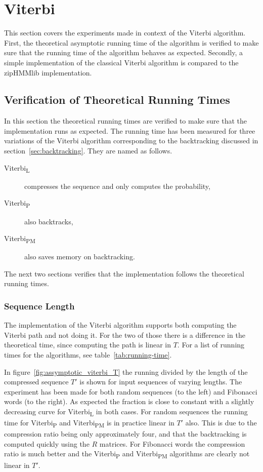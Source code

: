 \section{Viterbi}

This section covers the experiments made in context of the Viterbi algorithm.
First, the theoretical asymptotic running time of the algorithm is verified to
make sure that the running time of the algorithm behaves as expected. Secondly,
a simple implementation of the classical Viterbi algorithm is compared to the
zipHMMlib implementation.

\subsection{Verification of Theoretical Running Times}
\label{sec:theor-runn-times}

In this section the theoretical running times are verified to make sure that
the implementation runs as expected. The running time has been measured for
three variations of the Viterbi algorithm corresponding to the backtracking
discussed in section~\ref{sec:backtracking}. They are named as follows.
\begin{description}
\item[Viterbi\textsubscript{L}] compresses the sequence and only computes the
  probability,
\item[Viterbi\textsubscript{P}] also backtracks,
\item[Viterbi\textsubscript{PM}] also saves memory on backtracking.
\end{description}
The next two sections verifies that the implementation follows the theoretical
running times.

\subsubsection{Sequence Length}

The implementation of the Viterbi algorithm supports both computing the Viterbi
path and not doing it. For the two of those there is a difference in the
theoretical time, since computing the path is linear in $T$. For a list of
running times for the algorithms, see table~\ref{tab:running-time}.

In figure~\ref{fig:assymptotic_viterbi_T} the running divided by the length of
the compressed sequence $T'$ is shown for input sequences of varying lengths.
The experiment has been made for both random sequences (to the left) and
Fibonacci words (to the right). As expected the fraction is close to constant
with a slightly decreasing curve for Viterbi\textsubscript{L} in both cases.
For random sequences the running time for Viterbi\textsubscript{P} and
Viterbi\textsubscript{PM} is in practice linear in $T'$ also. This is due to
the compression ratio being only approximately four, and that the backtracking
is computed quickly using the $R$ matrices. For Fibonacci words the compression
ratio is much better and the Viterbi\textsubscript{P} and
Viterbi\textsubscript{PM} algorithms are clearly not linear in $T'$.

